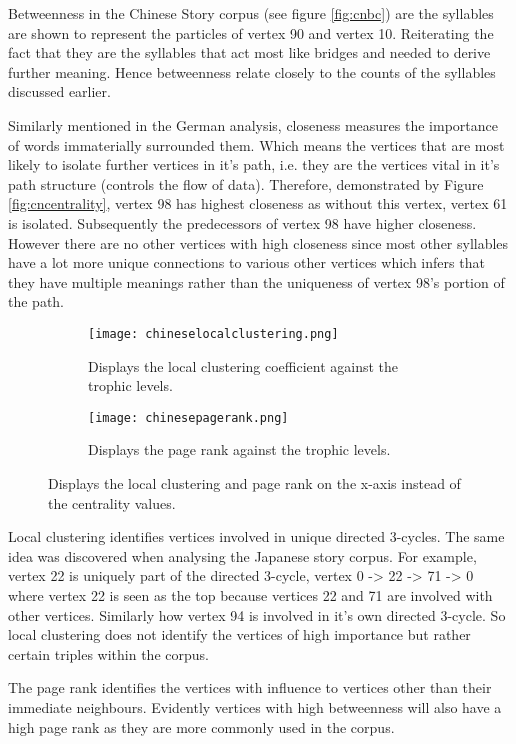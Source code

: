 Betweenness in the Chinese Story corpus (see figure \ref{fig:cnbc}) are the syllables are shown to represent the particles of vertex 90 and vertex 10. Reiterating the fact that they are the syllables that act most like bridges and needed to derive further meaning. Hence betweenness relate closely to the counts of the syllables discussed earlier.

Similarly mentioned in the German analysis, closeness measures the importance of words immaterially surrounded them. Which means the vertices that are most likely to isolate further vertices in it's path, i.e. they are the vertices vital in it's path structure (controls the flow of data). Therefore, demonstrated by Figure \ref{fig:cncentrality}, vertex 98 has highest closeness as without this vertex, vertex 61 is isolated. Subsequently the predecessors of vertex 98 have higher closeness. However there are no other vertices with high closeness since most other syllables have a lot more unique connections to various other vertices which infers that they have multiple meanings rather than the uniqueness of vertex 98's portion of the path.



\begin{figure}[H]
\centering
\begin{subfigure}{.45\textwidth}
	\hspace{-1cm} 
	\texttt{[image: chineselocalclustering.png]}
	\caption{Displays the local clustering coefficient against the trophic levels.}
	\label{fig:cnlc}
\end{subfigure}
\hfill
\begin{subfigure}{.45\textwidth}
	\hspace{-1cm} 
	\texttt{[image: chinesepagerank.png]}
	\caption{Displays the page rank against the trophic levels.}
	\label{fig:cnpr}
\end{subfigure}
\caption{Displays the local clustering and page rank on the x-axis instead of the centrality values.}
\label{fig:jpother}
\end{figure}

Local clustering identifies vertices involved in unique directed 3-cycles. The same idea was discovered when analysing the Japanese story corpus. For example, vertex 22 is uniquely part of the directed 3-cycle, vertex 0 -> 22 -> 71 -> 0 where vertex 22 is seen as the top because vertices 22 and 71 are involved with other vertices. Similarly how vertex 94 is involved in it's own directed 3-cycle. So local clustering does not identify the vertices of high importance but rather certain triples within the corpus. 

The page rank identifies the vertices with influence to vertices other than their immediate neighbours.  Evidently vertices with high betweenness will also have a high page rank as they are more commonly used in the corpus. 

